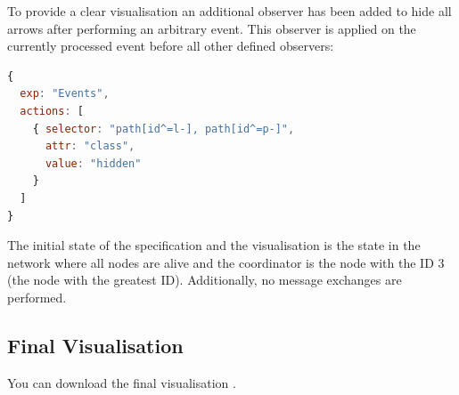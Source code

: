 To provide a clear visualisation an additional observer has been added to hide all arrows after performing an arbitrary event.
This observer is applied on the currently processed event before all other defined observers:

\begin{lstlisting}[language=JavaScript]
{
  exp: "Events",
  actions: [
    { selector: "path[id^=l-], path[id^=p-]", 
      attr: "class", 
      value: "hidden"
    }
  ]
}
\end{lstlisting}
 
The initial state of the specification and the visualisation is the state in the network where all nodes are alive and the coordinator is the node with the ID 3 (the node with the greatest ID). 
Additionally, no message exchanges are performed.

\subsection{Final Visualisation}

You can download the final visualisation .